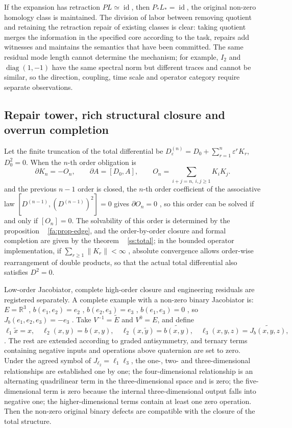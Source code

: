 \documentclass[11pt,a4paper]{article}
\theoremstyle{plain}
\theoremstyle{definition}
\theoremstyle{remark}
\begin{document}
\begin{CJK*}
If the expansion has retraction $P L\simeq\operatorname{id}$, then $P_*L_*=\operatorname{id}$, the original non-zero homology class is maintained. The division of labor between removing quotient and retaining the retraction repair of existing classes is clear: taking quotient merges the information in the specified core according to the task, repairs add witnesses and maintains the semantics that have been committed. The same residual mode length cannot determine the mechanism; for example, $I_2$ and $\operatorname{diag}(1,-1)$ have the same spectral norm but different traces and cannot be similar, so the direction, coupling, time scale and operator category require separate observations.

\subsection { Repair tower, rich structural closure and overrun completion }

Let the finite truncation of the total differential be $D_\varepsilon^{(n)}=D_0+\sum_{r=1}^n\varepsilon^rK_r$, $D_0^2=0$. When the $n$-th order obligation is \[
 \partial K_n=-O_n,\qquad
 \partial A=[D_0,A],\qquad
 O_n=\sum_{i+j=n,\ i,j\ge1}K_iK_j.
\] and the previous $n-1$ order is closed, the $n$-th order coefficient of the associative law $[D^{(n-1)},(D^{(n-1)})^2]=0$ gives $\partial O_n=0$ , so this order can be solved if and only if $[O_n]=0$. The solvability of this order is determined by the proposition ~ \ref{fa:prop-edge}, and the order-by-order closure and formal completion are given by the theorem ~ \ref{ss:total}; in the bounded operator implementation, if $\sum_{r\ge1}\|K_r\|<\infty$ , absolute convergence allows order-wise rearrangement of double products, so that the actual total differential also satisfies $D^2=0$.

Low-order Jacobiator, complete high-order closure and engineering residuals are registered separately. A complete example with a non-zero binary Jacobiator is: $E=\mathbb R^3$ , $b(e_1,e_2)=e_2$ , $b(e_2,e_3)=e_3$ , $b(e_1,e_3)=0$ , so $J_b(e_1,e_2,e_3)=-e_3$ . Take $V^{-1}=\widetilde E$ and $V^0=E$, and define \[
 \ell_1\widetilde x=x,\quad \ell_2(x,y)=b(x,y),\quad
 \ell_2(x,\widetilde y)=\widetilde{b(x,y)},\quad
 \ell_3(x,y,z)=\widetilde{J_b(x,y,z)},
\]. The rest are extended according to graded antisymmetry, and ternary terms containing negative inputs and operations above quaternion are set to zero. Under the agreed symbol of $J_{\ell_2}=\ell_1\ell_3$, the one-, two- and three-dimensional relationships are established one by one; the four-dimensional relationship is an alternating quadrilinear term in the three-dimensional space and is zero; the five-dimensional term is zero because the internal three-dimensional output falls into negative one; the higher-dimensional terms contain at least one zero operation. Then the non-zero original binary defects are compatible with the closure of the total structure.


\end{CJK*}
\end{document}
